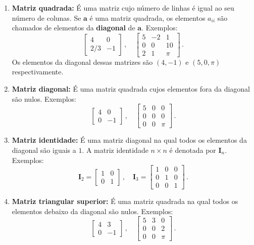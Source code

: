 \documentclass[12pt,a4paper]{report}
\newcommand{\tb}{\textbf}
\newcommand{\mb}{\mathbf}
\begin{document}
\begin{enumerate}
  \item \tb{Matriz quadrada:} É uma matriz cujo número de linhas é igual ao seu número de colunas. Se $\mb{a}$ é uma matriz quadrada, os elementos $a_{ii}$ são chamados de elementos da \tb{diagonal} de $\mb{a}$. Exemplos:
  $$\begin{bmatrix}
    4&0\\
    2/3&-1
  \end{bmatrix}\,,\quad \begin{bmatrix}
    5&-2&1\\
    0&0&10\\
    2&1&\pi
  \end{bmatrix}\,.$$
  Os elementos da diagonal dessas matrizes são $(4,-1)$ e $(5,0,\pi)$ respectivamente.
  \item \tb{Matriz diagonal:} É uma matriz quadrada cujos elementos fora da diagonal são nulos. Exemplos:
  $$\begin{bmatrix}
    4&0\\
    0&-1
  \end{bmatrix}\,,\quad \begin{bmatrix}
    5&0&0\\
    0&0&0\\
    0&0&\pi
  \end{bmatrix}\,.$$
  \item \tb{Matriz identidade:} É uma matriz diagonal na qual todos os elementos da diagonal são iguais a $1$. A matriz identidade $n\times n$ é denotada por $\mb{I}_n$. Exemplos:
  $$\mb{I}_2=\begin{bmatrix}
    1&0\\
    0&1
  \end{bmatrix}\,,\quad \mb{I}_3=\begin{bmatrix}
    1&0&0\\
    0&1&0\\
    0&0&1
  \end{bmatrix}\,.$$
  \item \tb{Matriz triangular superior:} É uma matriz quadrada na qual todos os elementos debaixo da diagonal são nulos. Exemplos:
  $$\begin{bmatrix}
    4&3\\
    0&-1
  \end{bmatrix}\,,\quad \begin{bmatrix}
    5&3&0\\
    0&0&2\\
    0&0&\pi
  \end{bmatrix}\,.$$

\end{enumerate}
\end{document}
